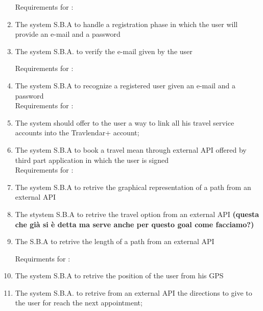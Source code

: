 \begin{enumerate}
Requirements for :

\item The system S.B.A to handle a registration phase in which the user will provide an e-mail and a password

\item The system S.B.A. to verify the e-mail given by the user

Requirements for :
\item The system S.B.A to recognize a registered user given an e-mail and a password
\\




Requirements for : 

\item The system should offer to the user a way to link all his travel service accounts into the Travlendar+ account;

\item The system S.B.A to book a travel mean through external API offered by third part application in which the user is signed
\\

Requirements for :

\item The system S.B.A to retrive the graphical representation of a path from an external API 

\item The stystem S.B.A to retrive the travel option from an external API \textbf{(questa che già si è detta ma serve anche per questo goal come facciamo?)}

\item The S.B.A to retrive the length of a path from an external API  


Requirments for :

\item The system S.B.A to retrive the position of the user from his GPS

\item The system S.B.A. to retrive from an external API the directions to give to the user for reach the next appointment; 


\end{enumerate}


